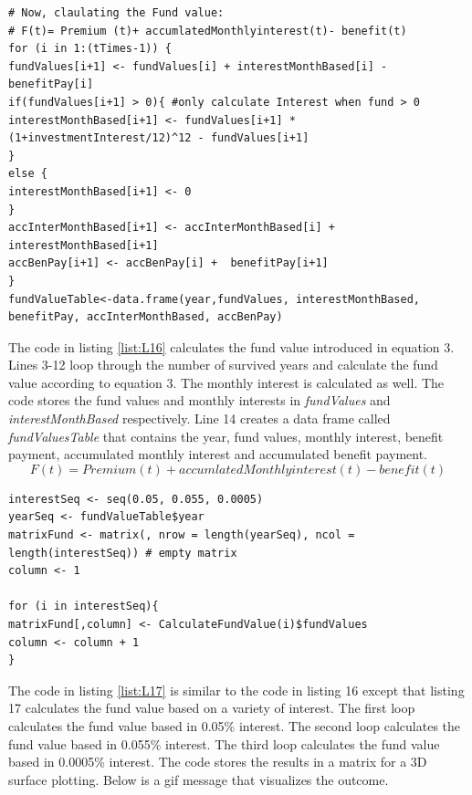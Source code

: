 \documentclass[12pt]{article}
\begin{document}
\begin{lstlisting}[caption={Calculating The Fund Value},captionpos=b,label={list:L16}]
# Now, claulating the Fund value:
# F(t)= Premium (t)+ accumlatedMonthlyinterest(t)- benefit(t)
for (i in 1:(tTimes-1)) {
fundValues[i+1] <- fundValues[i] + interestMonthBased[i] - benefitPay[i]
if(fundValues[i+1] > 0){ #only calculate Interest when fund > 0
interestMonthBased[i+1] <- fundValues[i+1] * (1+investmentInterest/12)^12 - fundValues[i+1] 
}
else {
interestMonthBased[i+1] <- 0
}
accInterMonthBased[i+1] <- accInterMonthBased[i] +  interestMonthBased[i+1]
accBenPay[i+1] <- accBenPay[i] +  benefitPay[i+1]
}
fundValueTable<-data.frame(year,fundValues, interestMonthBased, benefitPay, accInterMonthBased, accBenPay)
\end{lstlisting}
\pagebreak
The code in listing \ref{list:L16} calculates the fund value introduced in equation 3. Lines 3-12 loop through the number of survived years and calculate the fund value according to equation 3.  The monthly interest is calculated as well. The code stores the fund values and monthly interests in \textit{fundValues} and \textit{interestMonthBased} respectively. Line 14 creates a data frame called \textit{fundValuesTable} that contains the year, fund values, monthly interest, benefit payment, accumulated monthly interest and accumulated benefit payment.
\begin{equation}
F(t)= Premium (t)+ accumlatedMonthlyinterest(t)- benefit(t)
\end{equation}
\begin{lstlisting}[caption={Calculating The Fund Value Based on Different Interests},captionpos=b,label={list:L17}]
interestSeq <- seq(0.05, 0.055, 0.0005)
yearSeq <- fundValueTable$year
matrixFund <- matrix(, nrow = length(yearSeq), ncol = length(interestSeq)) # empty matrix
column <- 1

for (i in interestSeq){
matrixFund[,column] <- CalculateFundValue(i)$fundValues
column <- column + 1
}
\end{lstlisting}
The code in listing \ref{list:L17} is similar to the code in listing 16 except that listing 17 calculates the fund value based on a variety of interest. The first loop calculates the fund value based in 0.05\% interest. The second loop calculates the fund value based in 0.055\% interest. The third loop calculates the fund value based in 0.0005\% interest. The code stores the results in a matrix for a 3D surface plotting. Below is a gif message that visualizes the outcome.

\end{document}
